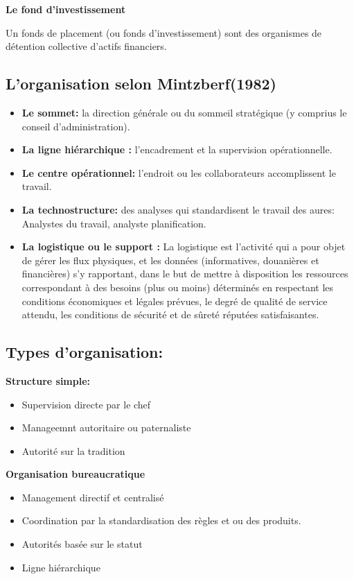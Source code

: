 \documentclass[12pt]{article}
\begin{document}
\textbf{Le fond d'investissement}

\begin{minipage}{0.8\textwidth}
Un fonds de placement (ou fonds d'investissement) sont des organismes de détention collective d'actifs financiers.
\end{minipage}

\subsection{L'organisation selon Mintzberf(1982)}
\begin{itemize}
\item \textbf{Le sommet:} la direction générale ou du sommeil stratégique (y comprius le conseil d'administration).\\
\item \textbf{La ligne hiérarchique : }l'encadrement et la supervision opérationnelle.\\
\item \textbf{Le centre opérationnel:} l'endroit ou les collaborateurs accomplissent le travail.\\
\item \textbf{La technostructure:} des analyses qui standardisent le travail des aures: Analystes du travail, analyste planification.\\
\item \textbf{La logistique ou le support :} La logistique est l'activité qui a pour objet de gérer les flux physiques, et les données (informatives, douanières et financières) s'y rapportant, dans le but de mettre à disposition les ressources correspondant à des besoins (plus ou moins) déterminés en respectant les conditions économiques et légales prévues, le degré de qualité de service attendu, les conditions de sécurité et de sûreté réputées satisfaisantes.
\end{itemize}

\subsection{Types d'organisation: }
\textbf{Structure simple:}
\begin{itemize}
\item Supervision directe par le chef
\item Manageemnt autoritaire ou paternaliste
\item Autorité sur la tradition
\end{itemize}

\textbf{Organisation bureaucratique}
\begin{itemize}
\item Management directif et centralisé
\item Coordination par la standardisation des règles et ou des produits.
\item Autorités basée sur le statut
\item Ligne hiérarchique
\end{itemize}
\end{document}
